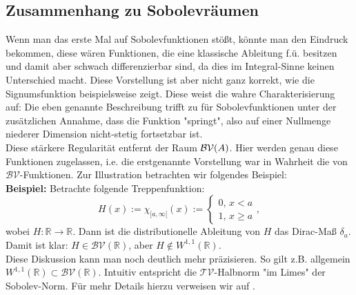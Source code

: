 \subsection{Zusammenhang zu Sobolevräumen}{\label{subsec:consobo}}
Wenn man das erste Mal auf Sobolevfunktionen stößt, könnte man den Eindruck bekommen, diese wären Funktionen, die eine klassische Ableitung f.ü. besitzen und damit aber schwach differenzierbar sind, da dies im Integral-Sinne keinen Unterschied macht. Diese Vorstellung ist aber nicht ganz korrekt, wie die Signumsfunktion beispielsweise zeigt. Diese weist die wahre Charakterisierung auf: Die eben genannte Beschreibung trifft zu für Sobolevfunktionen unter der zusätzlichen Annahme, dass die Funktion  "springt", also auf einer Nullmenge niederer Dimension nicht-stetig fortsetzbar ist.\\
Diese stärkere Regularität entfernt der Raum \(\mathcal{BV}(A)\). Hier werden genau diese Funktionen zugelassen, i.e. die erstgenannte Vorstellung war in Wahrheit die von \(\mathcal{BV}\)-Funktionen. Zur Illustration betrachten wir folgendes Beispiel:\\
\textbf{Beispiel:} Betrachte folgende Treppenfunktion:
\begin{equation}
    H(x) := \chi_{[a,\infty[}(x) := \begin{cases} 0, \, x < a \\ 1, \, x \geq a \end{cases},
\end{equation}
wobei \(H : \mathbb{R} \to \mathbb{R}\). Dann ist die distributionelle Ableitung von \(H\) das Dirac-Maß \(\delta_a\). Damit ist klar: \(H \in \mathcal{BV}(\mathbb{R})\), aber \(H \notin W^{1,1}(\mathbb{R})\).\\

Diese Diskussion kann man noch deutlich mehr präzisieren. So gilt z.B. allgemein \(W^{1,1}(\mathbb{R}) \subset \mathcal{BV}(\mathbb{R})\). Intuitiv entspricht die \(\mathcal{TV}\)-Halbnorm "im Limes" der Sobolev-Norm. Für mehr Details hierzu verweisen wir auf \cite{BVSobolev}.